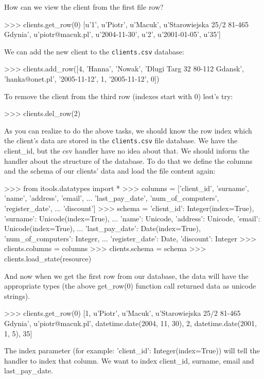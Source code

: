 \documentclass[a4paper]{book}
\begin{document}
How can we view the client from the first file row?
\begin{code}
    >>> clients.get_row(0)
    [u'1', u'Piotr', u'Macuk', u'Starowiejska 25/2 81-465 Gdynia',
    u'piotr@macuk.pl', u'2004-11-30', u'2', u'2001-01-05', u'35']
\end{code}
    
We can add the new client to the {\tt clients.csv} database:
\begin{code}
    >>> clients.add_row([4, 'Hanna', 'Nowak', 'Dlugi Targ 32 80-112 Gdansk',
    'hanka@onet.pl', '2005-11-12', 1, '2005-11-12', 0])
\end{code}

To remove the client from the third row (indexes start with 0) lest's try:
\begin{code}
    >>> clients.del_row(2)
\end{code}
As you can realize to do the above tasks, we should know the row index 
which the client's data are stored in the {\tt clients.csv} file database. 
We have the client\_id, but the csv handler have no idea about that. 
We should inform the handler about the structure of the database. To do that 
we define the columns and the schema of our clients' data and load the file 
content again:
\begin{code}
    >>> from itools.datatypes import *
    >>> columns = ['client_id', 'surname', 'name', 'address', 'email',
    ... 'last_pay_date', 'num_of_computers', 'register_date',
    ... 'discount']
    >>> schema = {'client_id': Integer(index=True), 'surname': Unicode(index=True),
    ... 'name': Unicode, 'address': Unicode, 'email': Unicode(index=True),
    ... 'last_pay_date': Date(index=True), 'num_of_computers': Integer,
    ... 'register_date': Date, 'discount': Integer}
    >>> clients.columns = columns
    >>> clients.schema = schema
    >>> clients.load_state(resource)
\end{code}

And now when we get the first row from our database, the data will have the 
appropriate types (the above get\_row(0) function call returned data as unicode 
strings).
\begin{code}
    >>> clients.get_row(0)
    [1, u'Piotr', u'Macuk', u'Starowiejska 25/2 81-465 Gdynia',
    u'piotr@macuk.pl', datetime.date(2004, 11, 30), 2, 
    datetime.date(2001, 1, 5), 35] 
\end{code}

The index parameter (for example: 'client\_id': Integer(index=True)) will 
tell the handler to index that column. We want to index client\_id, surname,
email and last\_pay\_date.
\end{document}

